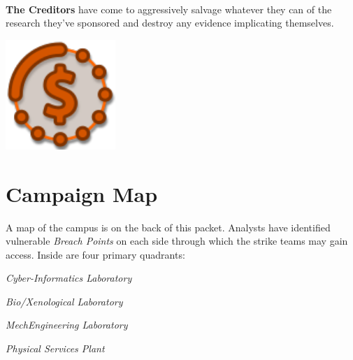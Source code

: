 \begin{minipage}{1.0\linewidth}
  \begin{minipage}[c]{1in}~
  \end{minipage}\quad
  \begin{minipage}[c]{4in}
    \textbf{The Creditors} have come to aggressively salvage
    whatever they can of the research they've sponsored and destroy any
    evidence implicating themselves.
  \end{minipage}\quad
  \begin{minipage}[c]{1in}
    \includegraphics[width=\linewidth]{art/icons/creditors.pdf}
  \end{minipage}
\end{minipage}

\section{Campaign Map}

A map of the campus is on the back of this packet.  Analysts have
identified vulnerable \textit{Breach Points} on each side through
which the strike teams may gain access.  Inside are four primary
quadrants:

\begin{minipage}[t]{\linewidth}\centering
\begin{minipage}[t]{3in}\centering
 \textit{Cyber-Informatics Laboratory}
  
 \textit{Bio/Xenological Laboratory}
\end{minipage}\quad%
\begin{minipage}[t]{3in}\centering
 \textit{MechEngineering Laboratory}
  
 \textit{Physical Services Plant}
\end{minipage}
\end{minipage}

